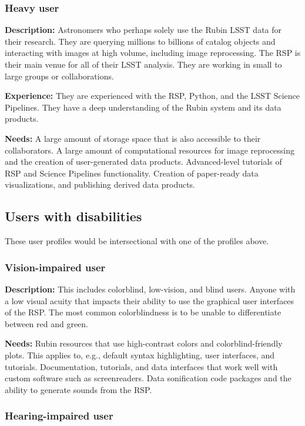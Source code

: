 \subsubsection{Heavy user}

\textbf{Description:} 
Astronomers who perhaps solely use the Rubin LSST data for their research.
They are querying millions to billions of catalog objects and interacting
with images at high volume, including image reprocessing.
The RSP is their main venue for all of their LSST analysis.
They are working in small to large groups or collaborations.

\textbf{Experience:} 
They are experienced with the RSP, Python, and the LSST Science Pipelines.
They have a deep understanding of the Rubin system and its data products.

\textbf{Needs:}
A large amount of storage space that is also accessible to their collaborators.
A large amount of computational resources for image reprocessing and the
creation of user-generated data products.
Advanced-level tutorials of RSP and Science Pipelines functionality.
Creation of paper-ready data visualizations, and publishing derived data products.

\subsection{Users with disabilities}

These user profiles would be intersectional with one of the profiles above.

\subsubsection{Vision-impaired user}

\textbf{Description:}
This includes colorblind, low-vision, and blind users.
Anyone with a low visual acuity that impacts their ability to use the 
graphical user interfaces of the RSP.
The most common colorblindness is to be unable to differentiate between red and green.

\textbf{Needs:}
Rubin resources that use high-contrast colors and colorblind-friendly plots.
This applies to, e.g., default syntax highlighting, user interfaces, and tutorials.
Documentation, tutorials, and data interfaces that work well with custom software such
as screenreaders.
Data sonification code packages and the ability to generate sounds from the RSP.

\subsubsection{Hearing-impaired user}

